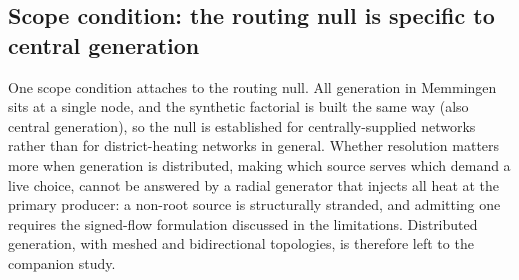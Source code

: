 \documentclass[a4paper,fleqn]{cas-sc}
\begin{document}
\subsection{Scope condition: the routing null is specific to central generation}
One scope condition attaches to the routing null. All generation in Memmingen sits at a
single node, and the synthetic factorial is built the same way (also central generation), so
the null is established for centrally-supplied networks rather than for district-heating
networks in general. Whether resolution matters more when generation is distributed, making
which source serves which demand a live choice, cannot be answered by a radial generator
that injects all heat at the primary producer: a non-root source is structurally stranded,
and admitting one requires the signed-flow formulation discussed in the limitations.
Distributed generation, with meshed and bidirectional topologies, is therefore left to the
companion study.
\end{document}

